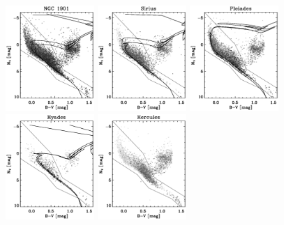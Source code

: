 \clearpage
\begin{figure}
\includegraphics[width=0.3\textwidth]{figs_groups/cmd_ngc1901.ps}
\includegraphics[width=0.3\textwidth]{figs_groups/cmd_sirius.ps}
\includegraphics[width=0.3\textwidth]{figs_groups/cmd_pleiades.ps}\\
\includegraphics[width=0.3\textwidth]{figs_groups/cmd_hyades.ps}
\includegraphics[width=0.3\textwidth]{figs_groups/cmd_hercules.ps}

\end{figure}
